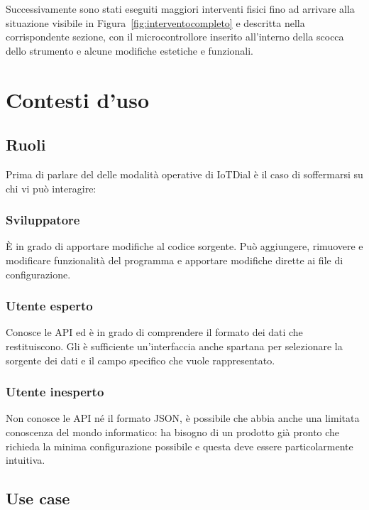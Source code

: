 \documentclass[12pt,a4paper]{report}
\begin{document}
Successivamente sono stati eseguiti maggiori interventi fisici fino ad arrivare alla situazione visibile in Figura~\ref{fig:interventocompleto}
e descritta nella corrispondente sezione, con il microcontrollore inserito all'interno della scocca dello strumento e alcune modifiche estetiche
e funzionali.

\section{Contesti d'uso}
\subsection{Ruoli}
Prima di parlare del delle modalità operative di IoTDial è il caso di soffermarsi su chi vi può interagire:
\subsubsection*{Sviluppatore}
È in grado di apportare modifiche al codice sorgente. Può aggiungere, rimuovere e  modificare funzionalità del programma
e apportare modifiche dirette ai file di configurazione.
\subsubsection*{Utente esperto}
Conosce le API ed è in grado di comprendere il formato dei dati che restituiscono. Gli è sufficiente un'interfaccia anche spartana
per selezionare la sorgente dei dati e il campo specifico che vuole rappresentato.
\subsubsection*{Utente inesperto}
Non conosce le API né il formato JSON, è possibile che abbia anche una limitata conoscenza del mondo informatico:
ha bisogno di un prodotto già pronto che richieda la minima configurazione possibile e questa
deve essere particolarmente intuitiva. 

\subsection{Use case}
\end{document}
